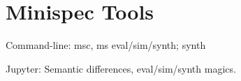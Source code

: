 \section{Minispec Tools}
\label{sec:tools}

Command-line: msc, ms eval/sim/synth; synth

Jupyter: Semantic differences, eval/sim/synth magics.

